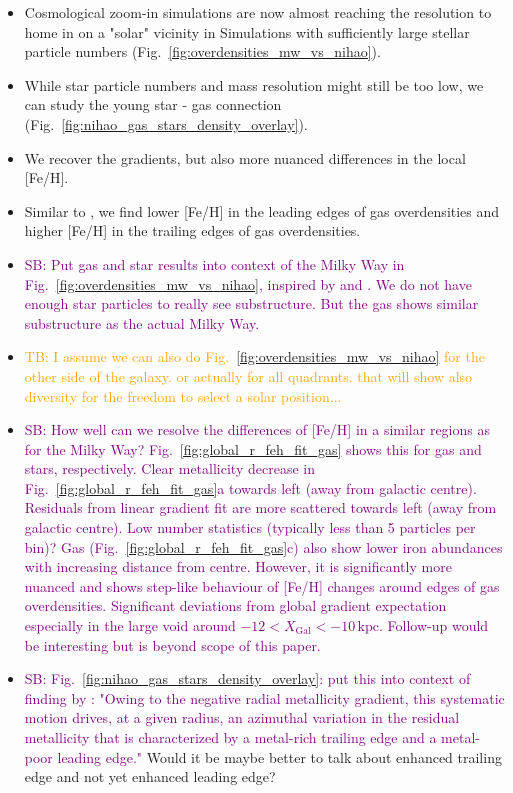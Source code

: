 \documentclass[fleqn,usenatbib]{mnras}
\newcommand{\SB}[1]{{\textcolor{purple}{SB: #1}}}
\newcommand{\TB}[1]{{\textcolor{orange}{TB: #1}}}
\begin{document}
\begin{itemize}
    \item Cosmological zoom-in simulations are now almost reaching the resolution to home in on a "solar" vicinity in Simulations with sufficiently large stellar particle numbers (Fig.~\ref{fig:overdensities_mw_vs_nihao}).
    \item While star particle numbers and mass resolution might still be too low, we can study the young star - gas connection (Fig.~\ref{fig:nihao_gas_stars_density_overlay}).
    \item We recover the gradients, but also more nuanced differences in the local [Fe/H].
    \item Similar to \citet{Grand2016}, we find lower [Fe/H] in the leading edges of gas overdensities and higher [Fe/H] in the trailing edges of gas overdensities.
    \item \SB{Put gas and star results into context of the Milky Way in Fig.~\ref{fig:overdensities_mw_vs_nihao}, inspired by \citet{Poggio2021} and \citet{Hackshaw2024}. We do not have enough star particles to really see substructure. But the gas shows similar substructure as the actual Milky Way.}
    \item \TB{I assume we can also do Fig.~\ref{fig:overdensities_mw_vs_nihao} for the other side of the galaxy. or actually for all quadrants. that will show also diversity for the freedom to select a solar position...}
    \item \SB{How well can we resolve the differences of [Fe/H] in a similar regions as for the Milky Way? Fig.~\ref{fig:global_r_feh_fit_gas} shows this for gas and stars, respectively. Clear metallicity decrease in Fig.~\ref{fig:global_r_feh_fit_gas}a towards left (away from galactic centre). Residuals from linear gradient fit are more scattered towards left (away from galactic centre). Low number statistics (typically less than 5 particles per bin)? Gas (Fig.~\ref{fig:global_r_feh_fit_gas}c) also show lower iron abundances with increasing distance from centre. However, it is significantly more nuanced and shows step-like behaviour of [Fe/H] changes around edges of gas overdensities. Significant deviations from global gradient expectation especially in the large void around $-12 < X_\mathrm{Gal} < -10\,\mathrm{kpc}$. Follow-up would be interesting but is beyond scope of this paper.}
\item \SB{Fig.~\ref{fig:nihao_gas_stars_density_overlay}: put this into context of finding by \citet{Grand2016}: "Owing to the negative radial metallicity gradient, this systematic motion drives, at a given radius, an azimuthal variation in the residual metallicity that is characterized by a metal-rich trailing edge and a metal-poor leading edge."} Would it be maybe better to talk about enhanced trailing edge and not yet enhanced leading edge? 

\end{itemize}
\end{document}
